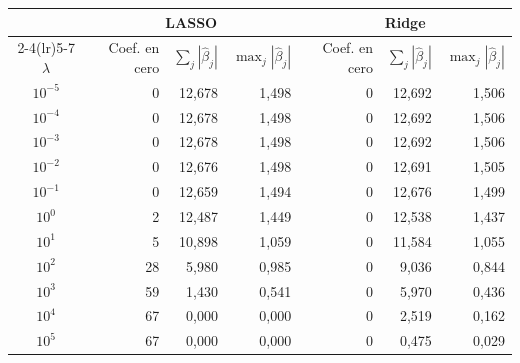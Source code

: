 \begin{tabular}{crrrrrr}
\toprule
 & \multicolumn{3}{c}{LASSO} & \multicolumn{3}{c}{Ridge} \\
\cmidrule(lr){2-4}\cmidrule(lr){5-7}
$\lambda$ & Coef. en cero & $\sum_j|\hat\beta_j|$ & $\max_j|\hat\beta_j|$ & Coef. en cero & $\sum_j|\hat\beta_j|$ & $\max_j|\hat\beta_j|$ \\
\midrule
$10^{-5}$ & 0 & 12,678 & 1,498 & 0 & 12,692 & 1,506 \\
$10^{-4}$ & 0 & 12,678 & 1,498 & 0 & 12,692 & 1,506 \\
$10^{-3}$ & 0 & 12,678 & 1,498 & 0 & 12,692 & 1,506 \\
$10^{-2}$ & 0 & 12,676 & 1,498 & 0 & 12,691 & 1,505 \\
$10^{-1}$ & 0 & 12,659 & 1,494 & 0 & 12,676 & 1,499 \\
$10^{0}$ & 2 & 12,487 & 1,449 & 0 & 12,538 & 1,437 \\
$10^{1}$ & 5 & 10,898 & 1,059 & 0 & 11,584 & 1,055 \\
$10^{2}$ & 28 & 5,980 & 0,985 & 0 & 9,036 & 0,844 \\
$10^{3}$ & 59 & 1,430 & 0,541 & 0 & 5,970 & 0,436 \\
$10^{4}$ & 67 & 0,000 & 0,000 & 0 & 2,519 & 0,162 \\
$10^{5}$ & 67 & 0,000 & 0,000 & 0 & 0,475 & 0,029 \\
\bottomrule
\end{tabular}
